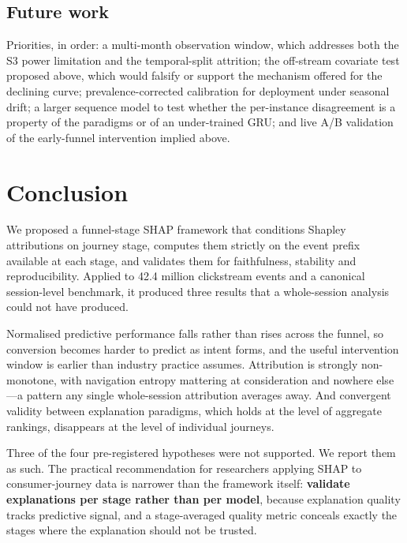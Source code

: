 \documentclass[review,3p,times,authoryear]{elsarticle}   %
\begin{document}
\subsection{Future work}

Priorities, in order: a multi-month observation window, which addresses both the S3
power limitation and the temporal-split attrition; the off-stream covariate test
proposed above, which would falsify or support the mechanism offered for the
declining curve; prevalence-corrected calibration for deployment under seasonal
drift; a larger sequence model to test whether the per-instance disagreement is a
property of the paradigms or of an under-trained GRU; and live A/B validation of the
early-funnel intervention implied above.

\section{Conclusion}

We proposed a funnel-stage SHAP framework that conditions Shapley attributions on
journey stage, computes them strictly on the event prefix available at each stage,
and validates them for faithfulness, stability and reproducibility. Applied to 42.4
million clickstream events and a canonical session-level benchmark, it produced
three results that a whole-session analysis could not have produced.

Normalised predictive performance falls rather than rises across the funnel, so
conversion becomes harder to predict as intent forms, and the useful intervention
window is earlier than industry practice assumes. Attribution is strongly
non-monotone, with navigation entropy mattering at consideration and nowhere
else---a pattern any single whole-session attribution averages away. And convergent
validity between explanation paradigms, which holds at the level of aggregate
rankings, disappears at the level of individual journeys.

Three of the four pre-registered hypotheses were not supported. We report them as
such. The practical recommendation for researchers applying SHAP to consumer-journey
data is narrower than the framework itself: \textbf{validate explanations per stage
rather than per model}, because explanation quality tracks predictive signal, and a
stage-averaged quality metric conceals exactly the stages where the explanation
should not be trusted.
\end{document}
